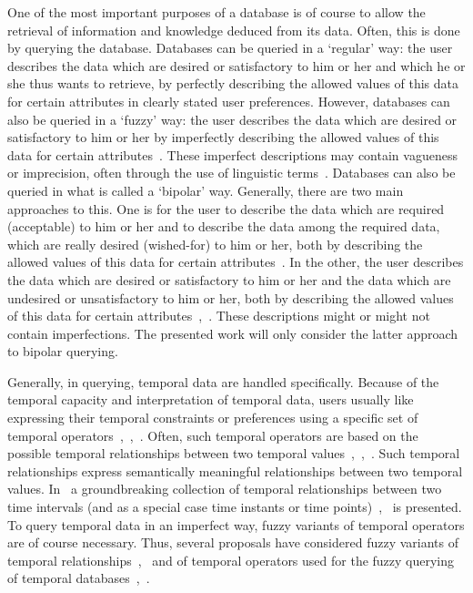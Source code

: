 \documentclass[runningheads,a4paper]{llncs}
\begin{document}
One of the most important purposes of a database is of course to allow the retrieval of information and knowledge deduced from its data. Often, this is done by querying the database. Databases can be queried in a `regular' way: the user describes the data which are desired or satisfactory to him or her and which he or she thus wants to retrieve, by perfectly describing the allowed values of this data for certain attributes in clearly stated user preferences. However, databases can also be queried in a `fuzzy' way: the user describes the data which are desired or satisfactory to him or her by imperfectly describing the allowed values of this data for certain attributes~\cite{DeCaluwe2007ijis}. These imperfect descriptions may contain vagueness or imprecision, often through the use of linguistic terms~\cite{Kacprzyk2001is}. Databases can also be queried in what is called a `bipolar' way. Generally, there are two main approaches to this. One is for the user to describe the data which are required (acceptable) to him or her and to describe the data among the required data, which are really desired (wished-for) to him or her, both by describing the allowed values of this data for certain attributes~\cite{Dubois2002lnai}. In the other, the user describes the data which are desired or satisfactory to him or her and the data which are undesired or unsatisfactory to him or her, both by describing the allowed values of this data for certain attributes~\cite{DeTre2010ieeetfs},~\cite{Matthe2011ijis}. These descriptions might or might not contain imperfections. The presented work will only consider the latter approach to bipolar querying.

Generally, in querying, temporal data are handled specifically. Because of the temporal capacity and interpretation of temporal data, users usually like expressing their temporal constraints or preferences using a specific set of temporal operators~\cite{Galindo2001},~\cite{Pons2012ijcis},~\cite{Schockaert2008ieeetfs}. Often, such temporal operators are based on the possible temporal relationships between two temporal values~\cite{Galindo2001},~\cite{Pons2012ijcis},~\cite{Schockaert2008ieeetfs}. Such temporal relationships express semantically meaningful relationships between two temporal values. In~\cite{Allen1983cacm} a groundbreaking collection of temporal relationships between two time intervals (and as a special case time instants or time points)~\cite{Dyreson1994sigmod},~\cite{Bohlen1998lncs} is presented. To query temporal data in an imperfect way, fuzzy variants of temporal operators are of course necessary. Thus, several proposals have considered fuzzy variants of temporal relationships~\cite{Schockaert2008ieeetfs},~\cite{Pons2013ijufkbs} and of temporal operators used for the fuzzy querying of temporal databases~\cite{Galindo2001},~\cite{Pons2012ipmu}.
\end{document}
